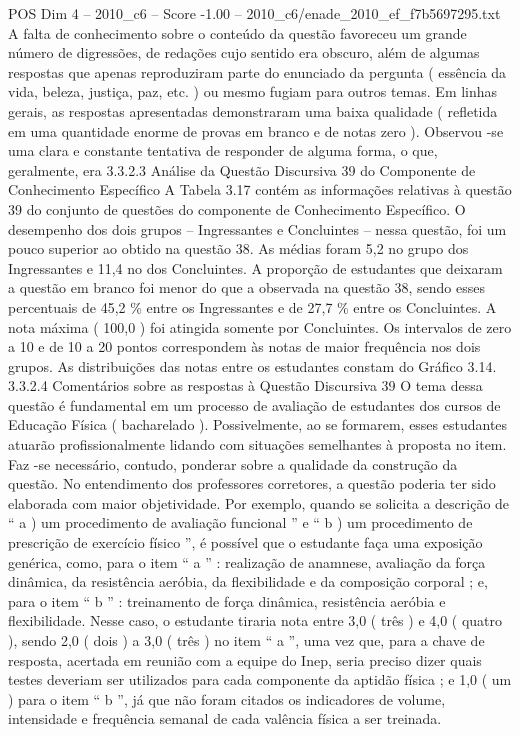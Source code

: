 \begin{textsample}{POS Dim 4 – 2010\_c6 – Score -1.00 – 2010\_c6/enade\_2010\_ef\_f7b5697295.txt}
A falta de conhecimento sobre o conteúdo da questão favoreceu um grande número de digressões, de redações cujo sentido era obscuro, além de algumas respostas que apenas reproduziram parte do enunciado da pergunta ( essência da vida, beleza, justiça, paz, etc. ) ou mesmo fugiam para outros temas.
Em linhas gerais, as respostas apresentadas demonstraram uma baixa qualidade ( refletida em uma quantidade enorme de provas em branco e de notas zero ).
Observou -se uma clara e constante tentativa de responder de alguma forma, o que, geralmente, era 3.3.2.3 Análise da Questão Discursiva 39 do Componente de Conhecimento Específico A Tabela 3.17 contém as informações relativas à questão 39 do conjunto de questões do componente de Conhecimento Específico.
O desempenho dos dois grupos – Ingressantes e Concluintes – nessa questão, foi um pouco superior ao obtido na questão 38.
As médias foram 5,2 no grupo dos Ingressantes e 11,4 no dos Concluintes.
A proporção de estudantes que deixaram a questão em branco foi menor do que a observada na questão 38, sendo esses percentuais de 45,2 \% entre os Ingressantes e de 27,7 \% entre os Concluintes.
A nota máxima ( 100,0 ) foi atingida somente por Concluintes.
Os intervalos de zero a 10 e de 10 a 20 pontos correspondem às notas de maior frequência nos dois grupos.
As distribuições das notas entre os estudantes constam do Gráfico 3.14. 3.3.2.4 Comentários sobre as respostas à Questão Discursiva 39 O tema dessa questão é fundamental em um processo de avaliação de estudantes dos cursos de Educação Física ( bacharelado ).
Possivelmente, ao se formarem, esses estudantes atuarão profissionalmente lidando com situações semelhantes à proposta no item.
Faz -se necessário, contudo, ponderar sobre a qualidade da construção da questão.
No entendimento dos professores corretores, a questão poderia ter sido elaborada com maior objetividade.
Por exemplo, quando se solicita a descrição de “ a ) um procedimento de avaliação funcional ” e “ b ) um procedimento de prescrição de exercício físico ”, é possível que o estudante faça uma exposição genérica, como, para o item “ a ” : realização de anamnese, avaliação da força dinâmica, da resistência aeróbia, da flexibilidade e da composição corporal ; e, para o item “ b ” : treinamento de força dinâmica, resistência aeróbia e flexibilidade.
Nesse caso, o estudante tiraria nota entre 3,0 ( três ) e 4,0 ( quatro ), sendo 2,0 ( dois ) a 3,0 ( três ) no item “ a ”, uma vez que, para a chave de resposta, acertada em reunião com a equipe do Inep, seria preciso dizer quais testes deveriam ser utilizados para cada componente da aptidão física ; e 1,0 ( um ) para o item “ b ”, já que não foram citados os indicadores de volume, intensidade e frequência semanal de cada valência física a ser treinada.

\end{textsample}

